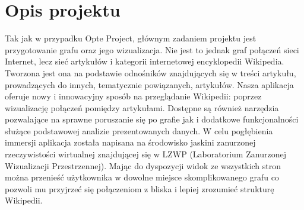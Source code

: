 \section{Opis projektu}
Tak jak w przypadku Opte Project, głównym zadaniem projektu jest przygotowanie grafu oraz jego wizualizacja. Nie jest to jednak graf połączeń sieci Internet, lecz sieć artykułów i kategorii internetowej encyklopedii Wikipedia. Tworzona jest ona na podstawie odnośników znajdujących się w treści artykułu, prowadzących do innych, tematycznie powiązanych, artykułów.
Nasza aplikacja oferuje nowy i innowacyjny sposób na przeglądanie Wikipedii: poprzez wizualizację połączeń pomiędzy artykułami. Dostępne są również narzędzia pozwalające na sprawne poruszanie się po grafie jak i dodatkowe funkcjonalności służące podstawowej analizie prezentowanych danych.
W celu pogłębienia immersji aplikacja została napisana na środowisko jaskini zanurzonej rzeczywistości wirtualnej znajdującej się w LZWP (Laboratorium Zanurzonej Wizualizacji Przestrzennej). Mając do dyspozycji widok ze wszystkich stron można przenieść użytkownika w dowolne miejsce skomplikowanego grafu co pozwoli mu przyjrzeć się połączeniom z bliska i lepiej zrozumieć strukturę Wikipedii.
